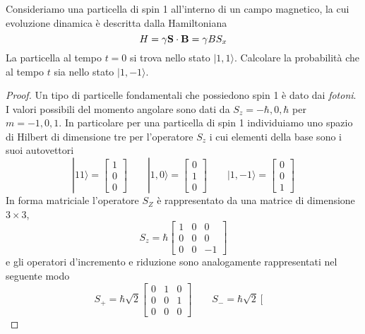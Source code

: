 Consideriamo una particella di spin 1 all'interno di un campo magnetico, la cui evoluzione dinamica \`e descritta dalla Hamiltoniana
\begin{equation*}
	H = \gamma \bold{S} \cdot \bold{B} =\gamma BS_x
\end{equation*}
La particella al tempo $t = 0$ si trova nello stato $|1,1  \rangle $. Calcolare la probabilit\`a che al tempo $t$ sia nello stato $|1,-1 \rangle $.
\begin{proof}
	Un tipo di particelle fondamentali che possiedono spin 1 \`e dato dai \textit{fotoni}. I valori possibili del momento angolare sono dati da $S_z = - \hbar ,0, \hbar $ per $m = -1,0,1$. In particolare per una particella di spin 1 individuiamo uno spazio di Hilbert di dimensione tre per l'operatore $S_z$ i cui elementi della base sono i suoi autovettori
	\begin{equation*}
		|11 \rangle = \left [ \begin{array}{c}
		1 \\ 0 \\ 0 
 		\end{array} \right ] \quad \quad |1,0 \rangle = 	\left [ \begin{array}{c}
		0 \\1 \\ 0 
 		\end{array} \right ] \quad \quad |1,-1 \rangle = \left [ \begin{array}{c}
		0 \\ 0 \\ 1 
 		\end{array} \right ]
	\end{equation*}
In forma matriciale l'operatore $S_Z$ \`e rappresentato da una matrice di dimensione $3 \times 3$,
\begin{equation*}
	S_z = \hbar \left [  \begin{array}{ccc} 1 & 0 & 0 \\
	0 & 0 & 0 \\
	0 & 0 & -1
	\end{array}\right ] 
\end{equation*}
e gli operatori d'incremento e riduzione sono analogamente rappresentati nel seguente modo
\begin{equation*}
	S_+ = \hbar \sqrt{2} \left [ \begin{array}{ccc}
		0 & 1 & 0 \\
		0 & 0 & 1 \\
		0 & 0 & 0 
	\end{array}\right ] \quad \quad S_- = \hbar \sqrt{2} \left [ \begin{array}{ccc}

\end{array}
\end{equation*}
\end{proof}
